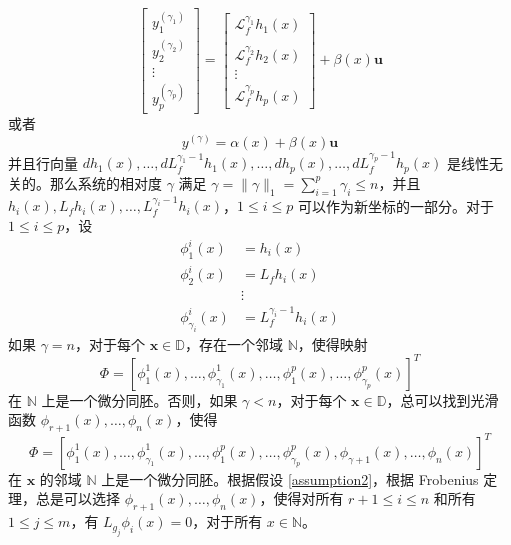 \begin{equation}
	\left.\left[\begin{array}{c}y_1^{(\gamma_1)}\\y_2^{(\gamma_2)}\\\vdots\\y_p^{(\gamma_p)}\end{array}\right.\right]=\left[\begin{array}{cccc}\mathcal{L}_f^{\gamma_1}h_1(x)\\\\\mathcal{L}_f^{\gamma_2}h_2(x)\\\vdots\\\mathcal{L}_f^{\gamma_p}h_p(x)\end{array}\right] +  \beta(x)  \boldsymbol{u}
  \end{equation}
  或者
  \begin{equation}
	y^{(\gamma)}=\alpha(x) + \beta(x) \boldsymbol{u}
	\label{outputdynamic}
  \end{equation}
  并且行向量 $dh_{1}(x),\ldots,dL_{f}^{\gamma_{1}-1}h_{1}(x),\ldots,dh_{p}(x),\ldots,dL_{f}^{\gamma_{p}-1}h_{p}(x)$ 是线性无关的。那么系统的相对度 $\gamma$ 满足 $\gamma=\|\gamma\|_{1}=\sum_{i=1}^{p}\gamma_{i}\leq n$，并且 $h_i(x),L_{f}h_i(x),\ldots,L_{f}^{\gamma_{i}-1}h_i(x)$，$1\leq i\leq p$ 可以作为新坐标的一部分。对于 $1\leq i\leq p$，设 
  \begin{equation}
	\begin{aligned}
	  \phi_{1}^{i}(x)&= h_{i}(x)\\
	  \phi_{2}^{i}(x)&= L_{f}h_{i}(x)\\
	  &\vdots\\
	  \phi_{\gamma_{i}}^{i}(x)&= L_{f}^{\gamma_{i}-1}h_{i}(x) 
	\end{aligned}
  \end{equation}
  如果 $\gamma  = n$，对于每个 $\boldsymbol{x} \in  \mathbb{D}$，存在一个邻域 $\mathbb{N}$，使得映射 
  \begin{equation}
  \Phi=[\phi_{1}^{1}(x),\ldots,\phi_{\gamma_1}^{1}(x),\ldots,\phi_{1}^{p}(x),\ldots,\phi_{\gamma_{p}}^{p}(x)]^{T}
  \end{equation}
  在 $\mathbb{N}$ 上是一个微分同胚。否则，如果 $\gamma < n$，对于每个 $\boldsymbol{x} \in  \mathbb{D}$，总可以找到光滑函数 $\phi_{r+1}(x),\ldots,\phi_{n}(x)$，使得
  \begin{equation}
	\Phi=[\phi_{1}^{1}(x),\ldots,\phi_{\gamma_1}^{1}(x),\ldots,\phi_{1}^{p}(x),\ldots,\phi_{\gamma_{p}}^{p}(x),\phi_{\gamma+1}(x),\ldots,\phi_{n}(x)]^{T}
  \end{equation}
  在 $\boldsymbol{x}$ 的邻域 $\mathbb{N}$ 上是一个微分同胚。根据假设 \ref{assumption2}，根据 Frobenius 定理，总是可以选择 $\phi_{r+1}(x),\ldots,\phi_{n}(x)$，使得对所有 $r+1\leq i\leq n$ 和所有 $1\leq j\leq m$，有 $L_{g_{j}}\phi_{i}(x)=0$，对于所有 $x \in \mathbb{N}$。 
  
